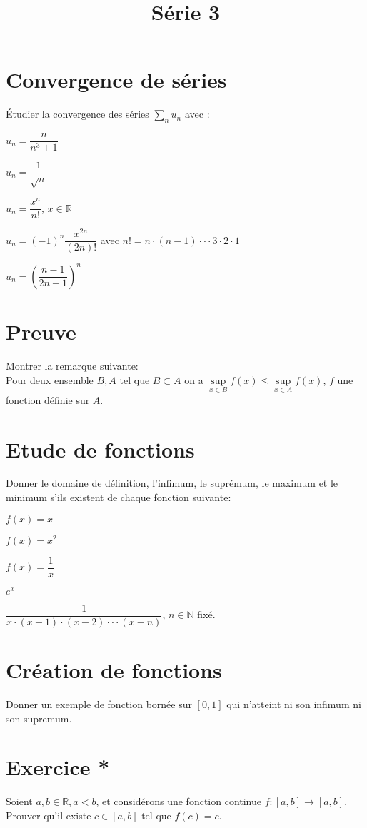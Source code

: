 \documentclass[a4paper, 12pt, french, twoside]{article}
\title{Série 3}
\newcommand{\Nn}{{\mathbb{N}}}
\newcommand{\Rr}{{\mathbb{R}}}
\begin{document}
\maketitle
\section{Convergence de séries}

Étudier la convergence des séries $\sum_n u_n $ avec : 

\begin{enumerate}
    \begin{multicols}{2}
    \item $u_n= \dfrac{n}{n^3+1}$
    \item $u_n=\dfrac{1}{\sqrt{n}}$
    \item $u_n=\dfrac{x^n}{n!}$, $x\in \Rr$
    \item $u_n=(-1)^n \dfrac{x^{2n}}{(2n)!}$ avec $n!=n\cdot (n-1)\cdot \cdot \cdot 3\cdot 2\cdot 1$
    \item $u_n=\left (\dfrac{n-1}{2n+1}\right )^n$
    \end{multicols}
\end{enumerate}

\section{Preuve}
Montrer la remarque suivante:\\

Pour deux ensemble $B,A$ tel que $B\subset A $ on a $\underset{x\in B}{\sup}f(x)\leq \underset{x\in A}{\sup}f(x)$, $f$ une fonction définie sur $A$.

\section{Etude de fonctions}
Donner le domaine de définition, l'infimum, le suprémum, le maximum et le minimum s'ils existent de chaque fonction suivante:

\begin{enumerate}
    \begin{multicols}{2}
        \item $f(x)=x$
        \item $f(x)=x^2$
        \item $f(x)=\dfrac{1}{x}$
        \item $e^x$
        \item $\dfrac{1}{x\cdot(x-1)\cdot(x-2)\cdot\cdot\cdot (x-n)}$, $n\in \Nn$ fixé. 
    \end{multicols} 
\end{enumerate}
\section{Création de fonctions}
Donner un exemple de fonction bornée sur $[0,1]$ qui n'atteint ni son infimum ni son supremum.

\section{Exercice *}
 Soient $a, b \in \Rr, a < b$, et considérons une fonction continue $f : [a, b] \to [a, b]$. Prouver qu’il existe $c \in[a, b]$ tel que $f(c)=c$. 
\end{document}
